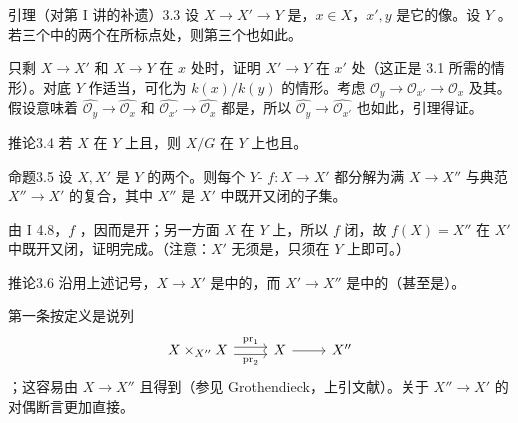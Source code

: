 \begin{SGAresult}{引理（对第 I 讲的补遗）}{3.3}
设 $X\to X'\to Y$ 是，$x\in X$，$x',y$ 是它的像。设 $Y$ 。若三个中的两个在所标点处，则第三个也如此。
\end{SGAresult}
只剩 $X\to X'$ 和 $X\to Y$ 在 $x$ 处时，证明 $X'\to Y$ 在 $x'$ 处（这正是 3.1 所需的情形）。对底 $Y$ 作适当，可化为 $k(x)/k(y)$ 的情形。考虑 $\mathcal O_y\to\mathcal O_{x'}\to\mathcal O_x$
及其。假设意味着 $\widehat{\mathcal O_y}\to\widehat{\mathcal O_x}$ 和 $\widehat{\mathcal O_{x'}}\to\widehat{\mathcal O_x}$ 都是，所以 $\widehat{\mathcal O_y}\to\widehat{\mathcal O_{x'}}$ 也如此，引理得证。
\begin{SGAresult}{推论}{3.4}
若 $X$ 在 $Y$ 上且，则 $X/G$ 在 $Y$ 上也且。
\end{SGAresult}
\begin{SGAresult}{命题}{3.5}
设 $X,X'$ 是 $Y$ 的两个。则每个 $Y$- $f:X\to X'$ 都分解为满 $X\to X''$ 与典范 $X''\to X'$ 的复合，其中 $X''$ 是 $X'$ 中既开又闭的子集。
\end{SGAresult}
由 I 4.8，$f$ ，因而是开；另一方面 $X$ 在 $Y$ 上，所以 $f$ 闭，故 $f(X)=X''$ 在 $X'$ 中既开又闭，证明完成。（注意：$X'$ 无须是，只须在 $Y$ 上即可。）
\begin{SGAresult}{推论}{3.6}
沿用上述记号，$X\to X'$ 是中的，而 $X'\to X''$ 是中的（甚至是）。
\end{SGAresult}
第一条按定义是说列
\[\begin{tikzcd}X\times_{X''}X\arrow[r,shift left=.6ex,"\operatorname{pr}_1"]\arrow[r,shift right=.6ex,"\operatorname{pr}_2"']&X\arrow[r]&X''\end{tikzcd}\]
；这容易由 $X\to X''$ 且得到（参见 Grothendieck，上引文献）。关于 $X''\to X'$ 的对偶断言更加直接。

